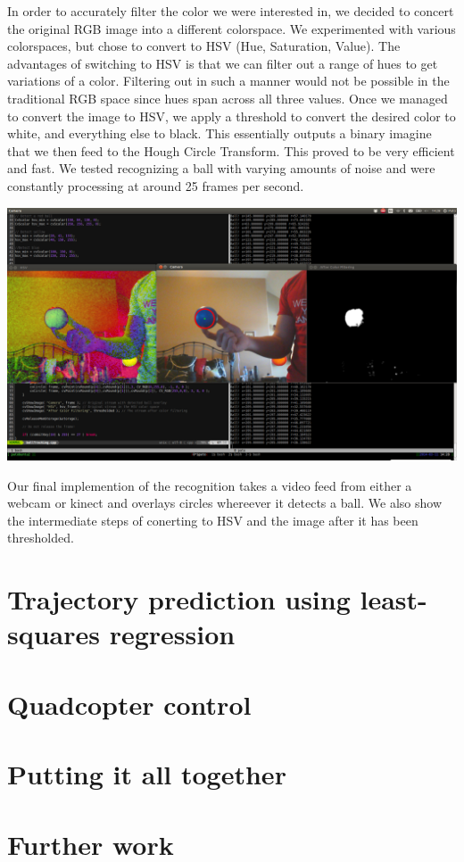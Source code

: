 \documentclass{article}
\begin{document}
In order to accurately filter the color we were interested in, we decided to concert the original
RGB image into a different colorspace. We experimented with various colorspaces, but chose to
convert to HSV (Hue, Saturation, Value). The advantages of switching to HSV is that we can filter
out a range of hues to get variations of a color. Filtering out in such a manner would not be
possible in the traditional RGB space since hues span across all three values. Once we managed
to convert the image to HSV, we apply a threshold to convert the desired color to white, and
everything else to black. This essentially outputs a binary imagine that we then feed to the
Hough Circle Transform. This proved to be very efficient and fast. We tested recognizing a ball
with varying amounts of noise and were constantly processing at around 25 frames per second.

\includegraphics[scale=0.15]{../images/DetectingBlue.png}

Our final implemention of the recognition takes a video feed from either a webcam or kinect
and overlays circles whereever it detects a ball. We also show the intermediate steps of conerting
to HSV and the image after it has been thresholded.

\section{Trajectory prediction using least-squares regression}

\section{Quadcopter control}

\section{Putting it all together}

\section{Further work}
\end{document}
